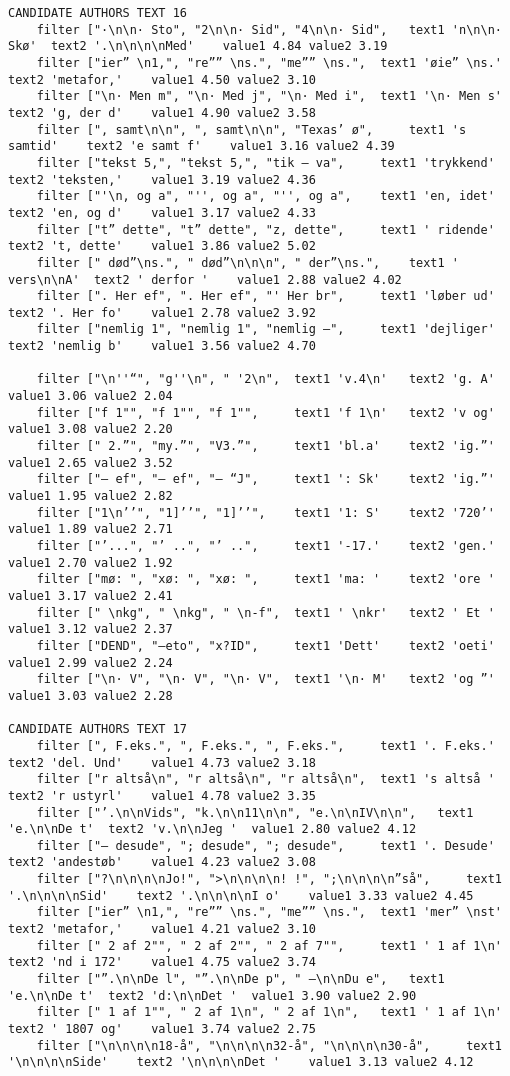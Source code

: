 {\begin{verbatim}
CANDIDATE AUTHORS TEXT 16
	filter ["·\n\n· Sto", "2\n\n· Sid", "4\n\n· Sid", 	text1 'n\n\n· Skø'	text2 '.\n\n\n\nMed'	value1 4.84	value2 3.19
	filter ["ier” \n1,", "re”” \ns.", "me”” \ns.", 	text1 'øie” \ns.'	text2 'metafor,'	value1 4.50	value2 3.10
	filter ["\n· Men m", "\n· Med j", "\n· Med i", 	text1 '\n· Men s'	text2 'g, der d'	value1 4.90	value2 3.58
	filter [", samt\n\n", ", samt\n\n", "Texas’ ø", 	text1 's samtid'	text2 'e samt f'	value1 3.16	value2 4.39
	filter ["tekst 5,", "tekst 5,", "tik – va", 	text1 'trykkend'	text2 'teksten,'	value1 3.19	value2 4.36
	filter ["'\n, og a", "'', og a", "'', og a", 	text1 'en, idet'	text2 'en, og d'	value1 3.17	value2 4.33
	filter ["t” dette", "t” dette", "z, dette", 	text1 ' ridende'	text2 't, dette'	value1 3.86	value2 5.02
	filter [" død”\ns.", " død”\n\n\n", " der”\ns.", 	text1 ' vers\n\nA'	text2 ' derfor '	value1 2.88	value2 4.02
	filter [". Her ef", ". Her ef", "' Her br", 	text1 'løber ud'	text2 '. Her fo'	value1 2.78	value2 3.92
	filter ["nemlig 1", "nemlig 1", "nemlig –", 	text1 'dejliger'	text2 'nemlig b'	value1 3.56	value2 4.70

	filter ["\n''“", "g''\n", " '2\n", 	text1 'v.4\n'	text2 'g. A'	value1 3.06	value2 2.04
	filter ["f 1"", "f 1"", "f 1"", 	text1 'f 1\n'	text2 'v og'	value1 3.08	value2 2.20
	filter [" 2.”", "my.”", "V3.”", 	text1 'bl.a'	text2 'ig.”'	value1 2.65	value2 3.52
	filter ["– ef", "– ef", "– “J", 	text1 ': Sk'	text2 'ig.”'	value1 1.95	value2 2.82
	filter ["1\n’’", "1]’’", "1]’’", 	text1 '1: S'	text2 '720’'	value1 1.89	value2 2.71
	filter ["’...", "’ ..", "’ ..", 	text1 '-17.'	text2 'gen.'	value1 2.70	value2 1.92
	filter ["mø: ", "xø: ", "xø: ", 	text1 'ma: '	text2 'ore '	value1 3.17	value2 2.41
	filter [" \nkg", " \nkg", " \n-f", 	text1 ' \nkr'	text2 ' Et '	value1 3.12	value2 2.37
	filter ["DEND", "–eto", "x?ID", 	text1 'Dett'	text2 'oeti'	value1 2.99	value2 2.24
	filter ["\n· V", "\n· V", "\n· V", 	text1 '\n· M'	text2 'og ”'	value1 3.03	value2 2.28

CANDIDATE AUTHORS TEXT 17
	filter [", F.eks.", ", F.eks.", ", F.eks.", 	text1 '. F.eks.'	text2 'del. Und'	value1 4.73	value2 3.18
	filter ["r altså\n", "r altså\n", "r altså\n", 	text1 's altså '	text2 'r ustyrl'	value1 4.78	value2 3.35
	filter ["’.\n\nVids", "k.\n\n11\n\n", "e.\n\nIV\n\n", 	text1 'e.\n\nDe t'	text2 'v.\n\nJeg '	value1 2.80	value2 4.12
	filter ["– desude", "; desude", "; desude", 	text1 '. Desude'	text2 'andestøb'	value1 4.23	value2 3.08
	filter ["?\n\n\n\nJo!", ">\n\n\n\n! !", ";\n\n\n\n”så", 	text1 '.\n\n\n\nSid'	text2 '.\n\n\n\nI o'	value1 3.33	value2 4.45
	filter ["ier” \n1,", "re”” \ns.", "me”” \ns.", 	text1 'mer” \nst'	text2 'metafor,'	value1 4.21	value2 3.10
	filter [" 2 af 2"", " 2 af 2"", " 2 af 7"", 	text1 ' 1 af 1\n'	text2 'nd i 172'	value1 4.75	value2 3.74
	filter ["”.\n\nDe l", "”.\n\nDe p", " –\n\nDu e", 	text1 'e.\n\nDe t'	text2 'd:\n\nDet '	value1 3.90	value2 2.90
	filter [" 1 af 1"", " 2 af 1\n", " 2 af 1\n", 	text1 ' 1 af 1\n'	text2 ' 1807 og'	value1 3.74	value2 2.75
	filter ["\n\n\n\n18-å", "\n\n\n\n32-å", "\n\n\n\n30-å", 	text1 '\n\n\n\nSide'	text2 '\n\n\n\nDet '	value1 3.13	value2 4.12


\end{verbatim}}
